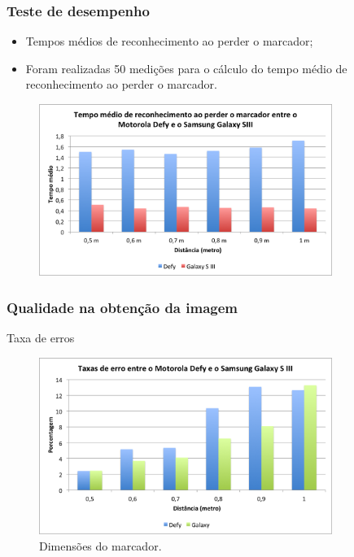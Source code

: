 \documentclass{beamer}
\begin{document}
	\begin{frame}
		\frametitle{Teste de desempenho}
		
		\begin{itemize}
		  \item Tempos médios de reconhecimento ao perder o marcador;
		  \item Foram realizadas 50 medições para o cálculo do tempo médio de reconhecimento ao
		  		perder o marcador. 
		\end{itemize}
		
				
		\begin{figure}[htb]
			\begin{center}
					\includegraphics[width=0.85\textwidth]{figuras/grafico_des_perda.png}
			\end{center}
		\end{figure}
	\end{frame}
	
	\begin{frame}
		\frametitle{Qualidade na obtenção da imagem}
		
		Taxa de erros
		
		\begin{figure}[htb]
			\begin{center}
					\includegraphics[width=0.85\textwidth]{figuras/taxa_erro_qualidade.png}
			\end{center}
			\caption{Dimensões do marcador.}
			\label{fig:marcador_testes}
		\end{figure}
	\end{frame}
	
\end{document}
